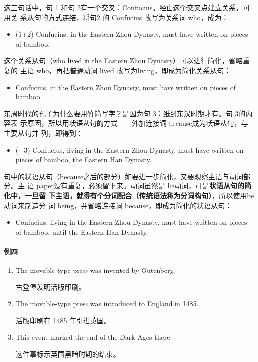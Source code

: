 这三句话中，句 1 和句 2有一个交叉：Confucius。经由这个交叉点建立关系，可用关
系从句的方式连结，将句2 的 Confucius 改写为关系词 who，成为：
\begin{itemize}
\item (1+2) Confucius,  in the Eastern Zhou Dynasty, must have
  written on pieces of bamboo.
\end{itemize}
这个关系从句（who lived in the Eastern Zhou Dynasty）可以进行简化，省略重复的
主语 who，再把普通动词 lived 改写为living，即成为简化关系从句：
\begin{itemize}
\item Confucius,  in the Eastern Zhou Dynasty, must have written on
  pieces of bamboo.
\end{itemize}
东周时代的孔子为什么要用竹简写字？是因为句 3：纸到东汉时期才有。句 3的内容表
示原因，所以用状语从句的方式——外加连接词 because成为状语从句，与主要从句并
列，即得到：
\begin{itemize}
\item (+3) Confucius, living in the Eastern Zhou Dynasty, must have written on
  pieces of bamboo,  the Eastern Han Dynasty.
\end{itemize}

句中的状语从句（because之后的部分）如要进一步简化，又要观察主语与动词部分。主
语 paper没有重复，必须留下来。动词虽然是 be动词，可是\textbf{状语从句的简化中，一旦留
下主语，就得有个分词配合（传统语法称为分词构句）}，所以使用be 动词来制造分
词 being，并省略连接词 because，即成为简化的状语从句：

\begin{itemize}
\item Confucius, living in the Eastern Zhou Dynasty, must have written on
  pieces of bamboo,  until the Eastern Han Dynasty.
\end{itemize}

\paragraph{例四}

\begin{enumerate}
\item The movable-type press was invented by Gutenberg.

  古登堡发明活版印刷。
\item The movable-type press was introduced to England in 1485.

  活版印刷在 1485 年引进英国。
\item This event marked the end of the Dark Ages there.

  这件事标示英国黑暗时期的结束。
\end{enumerate}

